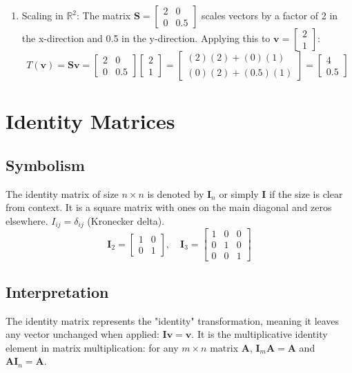 \documentclass{article}
\newcommand{\vect}[1]{\bm{#1}} %
\newcommand{\mat}[1]{\bm{#1}}  %
\newcommand{\R}{\mathbb{R}}    %
\begin{document}
\begin{enumerate}
    \item Scaling in $\R^2$: The matrix $\mat{S} = \begin{bmatrix} 2 & 0 \\ 0 & 0.5 \end{bmatrix}$ scales vectors by a factor of 2 in the x-direction and 0.5 in the y-direction. Applying this to $\vect{v} = \begin{bmatrix} 2 \\ 1 \end{bmatrix}$:
     \[ T(\vect{v}) = \mat{S}\vect{v} = \begin{bmatrix} 2 & 0 \\ 0 & 0.5 \end{bmatrix} \begin{bmatrix} 2 \\ 1 \end{bmatrix} = \begin{bmatrix} (2)(2)+(0)(1) \\ (0)(2)+(0.5)(1) \end{bmatrix} = \begin{bmatrix} 4 \\ 0.5 \end{bmatrix} \]
\end{enumerate}

\section{Identity Matrices}

\subsection*{Symbolism}
The identity matrix of size $n \times n$ is denoted by $\mat{I}_n$ or simply $\mat{I}$ if the size is clear from context. It is a square matrix with ones on the main diagonal and zeros elsewhere. $I_{ij} = \delta_{ij}$ (Kronecker delta).
\[ \mat{I}_2 = \begin{bmatrix} 1 & 0 \\ 0 & 1 \end{bmatrix}, \quad \mat{I}_3 = \begin{bmatrix} 1 & 0 & 0 \\ 0 & 1 & 0 \\ 0 & 0 & 1 \end{bmatrix} \]

\subsection*{Interpretation}
The identity matrix represents the "identity" transformation, meaning it leaves any vector unchanged when applied: $\mat{I}\vect{v} = \vect{v}$. It is the multiplicative identity element in matrix multiplication: for any $m \times n$ matrix $\mat{A}$, $\mat{I}_m \mat{A} = \mat{A}$ and $\mat{A} \mat{I}_n = \mat{A}$.
\end{document}
